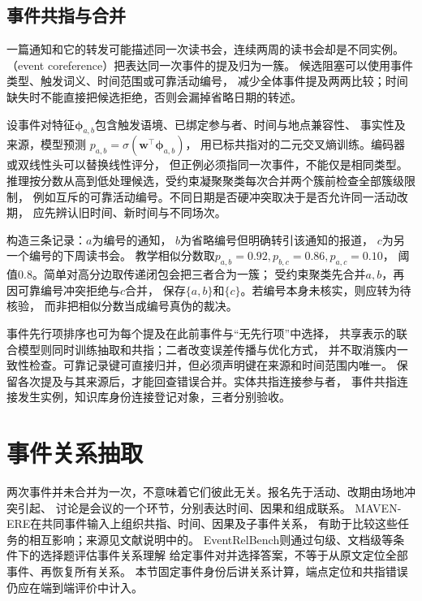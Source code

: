 \subsection{事件共指与合并}
\label{sec:nlp-extraction-event-coreference}

一篇通知和它的转发可能描述同一次读书会，连续两周的读书会却是不同实例。
（event coreference）把表达同一次事件的提及归为一簇。
候选阻塞可以使用事件类型、触发词义、时间范围或可靠活动编号，
减少全体事件提及两两比较；时间缺失时不能直接把候选拒绝，否则会漏掉省略日期的转述。

设事件对特征$\bm{\phi}_{a,b}$包含触发语境、已绑定参与者、时间与地点兼容性、
事实性及来源，模型预测
$p_{a,b}=\sigma(\bm{w}^{\top}\bm{\phi}_{a,b})$，
用已标共指对的二元交叉熵训练。编码器或双线性头可以替换线性评分，
但正例必须指同一次事件，不能仅是相同类型。
推理按分数从高到低处理候选，受约束凝聚聚类每次合并两个簇前检查全部簇级限制，
例如互斥的可靠活动编号。不同日期是否硬冲突取决于是否允许同一活动改期，
应先辨认旧时间、新时间与不同场次。

构造三条记录：$a$为编号的通知，
$b$为省略编号但明确转引该通知的报道，
$c$为另一个编号的下周读书会。
教学相似分数取$p_{a,b}=0.92,p_{b,c}=0.86,p_{a,c}=0.10$，
阈值0.8。简单对高分边取传递闭包会把三者合为一簇；
受约束聚类先合并$a,b$，再因可靠编号冲突拒绝与$c$合并，
保存$\{a,b\}$和$\{c\}$。若编号本身未核实，则应转为待核验，
而非把相似分数当成编号真伪的裁决。

事件先行项排序也可为每个提及在此前事件与“无先行项”中选择，
共享表示的联合模型则同时训练抽取和共指；二者改变误差传播与优化方式，
并不取消簇内一致性检查。可靠记录键可直接归并，但必须声明键在来源和时间范围内唯一。
保留各次提及与其来源后，才能回查错误合并。实体共指连接参与者，
事件共指连接发生实例，知识库身份连接登记对象，三者分别验收。

\section{事件关系抽取}
\label{sec:nlp-extraction-event-relations}

两次事件并未合并为一次，不意味着它们彼此无关。报名先于活动、改期由场地冲突引起、
讨论是会议的一个环节，分别表达时间、因果和组成联系。
MAVEN-ERE在共同事件输入上组织共指、时间、因果及子事件关系，
有助于比较这些任务的相互影响；来源见文献说明中的。
EventRelBench则通过句级、文档级等条件下的选择题评估事件关系理解
给定事件对并选择答案，不等于从原文定位全部事件、再恢复所有关系。
本节固定事件身份后讲关系计算，端点定位和共指错误仍应在端到端评价中计入。

